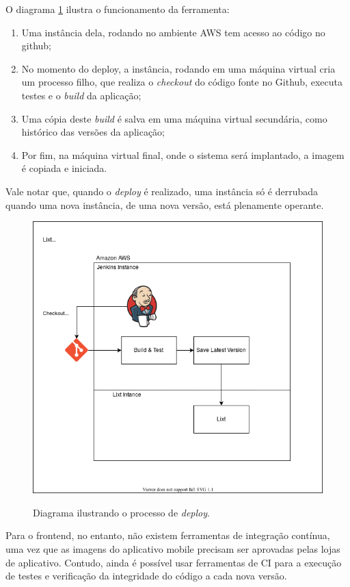 O diagrama \ref{fig:jenkins} ilustra o funcionamento da ferramenta:
\begin{enumerate}
\item Uma instância dela, rodando no ambiente AWS tem acesso ao código no
github;
\item No momento do \gls{deploy}, a instância, rodando em uma máquina
  virtual cria um processo filho, que realiza o \emph{checkout} do
  código fonte no Github, executa testes e o \emph{build} da
  aplicação;
\item Uma cópia deste \emph{build} é salva em uma máquina virtual
  secundária, como histórico das versões da aplicação;
\item Por fim, na máquina virtual final, onde o sistema será
  implantado, a imagem é copiada e iniciada.
\end{enumerate}
Vale notar que, quando o \emph{deploy} é realizado, uma instância só é
derrubada quando uma nova instância, de uma nova versão, está
plenamente operante.

\begin{figure}[h]
  \centering
  \caption{Diagrama ilustrando o processo de \emph{deploy}.}
  \includegraphics[scale=0.50]{images/deploy}
  \label{fig:jenkins}
\end{figure}

Para o \gls{frontend}, no entanto, não existem ferramentas de
integração contínua, uma vez que as imagens do aplicativo mobile
precisam ser aprovadas pelas lojas de aplicativo. Contudo, ainda é
possível usar ferramentas de CI para a execução de testes e
verificação da integridade do código a cada nova versão.

